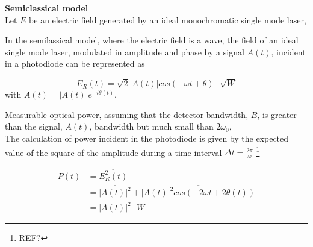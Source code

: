 \begin{bibunit}[plain]
{\bf Semiclassical model}\\

Let $E$ be an electric field generated by an ideal monochromatic single mode laser, 
\cite{shapiro1985quantum} %

In the semilassical model, where the electric field is a wave, the field of an ideal single mode laser, modulated in amplitude and phase by a signal $A(t)$, incident in a photodiode can be represented as

\begin{equation}
    E_R(t)=\sqrt{2} |A(t)| cos\left(-\omega t + \theta\right) \,\,\,\, \sqrt{W}
\end{equation}
with $A(t)=|A(t)|e^{-i\theta(t)}$.

Measurable optical power, assuming that the detector bandwidth, $B$, is greater than the signal, $A(t)$, bandwidth but much small than $2 \omega_0$, %
\\
The calculation of power incident in the photodiode is given by the expected value of the square of the amplitude during a time interval $\Delta t = \frac{2 \pi}{\omega}$
\footnote{REF?}

\begin{align}
	P(t)	&= \overline{E_R^2(t)}\nonumber\\
			&= \overline{|A(t)|^2} + \overline{ |A(t)|^2 cos\left(-2 \omega t + 2\theta(t)\right)}\nonumber\\
         &= |A(t)|^2 \,\,\,\, W
\end{align}




\end{bibunit}
